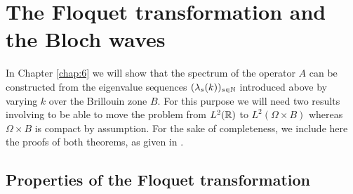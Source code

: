 \chapter{The Floquet transformation and the Bloch waves} \label{chap:5}

In Chapter \ref{chap:6} we will show that the spectrum of the operator $A$ can be constructed from the eigenvalue sequences $(\lambda_{s}(k))_{s \in \mathbb{N}}$ introduced above by varying $k$ over the Brillouin zone $B$. For this purpose we will need two results involving to be able to move the problem from $L^{2}(\mathbb{R})$ to $L^{2}(\Omega \times B)$ whereas $\Omega \times B$ is compact by assumption. For the sake of completeness, we include here the proofs of both theorems, as given in \cite[section 3.4, 3.5]{dorfler2011photonic}.

\section{Properties of the Floquet transformation}

